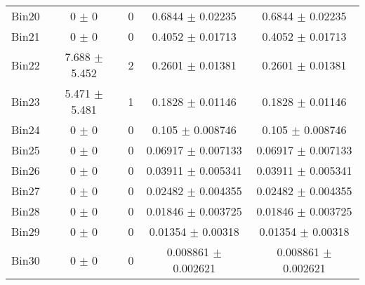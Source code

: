\begin{tabular}{@{\extracolsep{4pt}}lcccc@{}}
     Bin20 & 0 $\pm$ 0 & 0 & 0.6844 $\pm$ 0.02235 & 0.6844 $\pm$ 0.02235 \\ 
     Bin21 & 0 $\pm$ 0 & 0 & 0.4052 $\pm$ 0.01713 & 0.4052 $\pm$ 0.01713 \\ 
     Bin22 & 7.688 $\pm$ 5.452 & 2 & 0.2601 $\pm$ 0.01381 & 0.2601 $\pm$ 0.01381 \\ 
     Bin23 & 5.471 $\pm$ 5.481 & 1 & 0.1828 $\pm$ 0.01146 & 0.1828 $\pm$ 0.01146 \\ 
     Bin24 & 0 $\pm$ 0 & 0 & 0.105 $\pm$ 0.008746 & 0.105 $\pm$ 0.008746 \\ 
     Bin25 & 0 $\pm$ 0 & 0 & 0.06917 $\pm$ 0.007133 & 0.06917 $\pm$ 0.007133 \\ 
     Bin26 & 0 $\pm$ 0 & 0 & 0.03911 $\pm$ 0.005341 & 0.03911 $\pm$ 0.005341 \\ 
     Bin27 & 0 $\pm$ 0 & 0 & 0.02482 $\pm$ 0.004355 & 0.02482 $\pm$ 0.004355 \\ 
     Bin28 & 0 $\pm$ 0 & 0 & 0.01846 $\pm$ 0.003725 & 0.01846 $\pm$ 0.003725 \\ 
     Bin29 & 0 $\pm$ 0 & 0 & 0.01354 $\pm$ 0.00318 & 0.01354 $\pm$ 0.00318 \\ 
     Bin30 & 0 $\pm$ 0 & 0 & 0.008861 $\pm$ 0.002621 & 0.008861 $\pm$ 0.002621 \\ 
\hline\hline
  \end{tabular}
